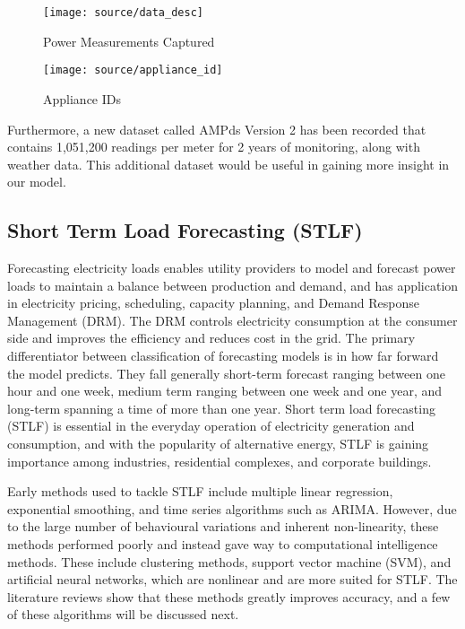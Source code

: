 \documentclass[12pt,twocolumn]{article}
\begin{document}
				\begin{figure}[!htbp]
					\centering
					\texttt{[image: source/data\_desc]}
					\caption{Power Measurements Captured}
					\label{fig:varnorm}
				\end{figure}

				\begin{figure}[!h]
					\centering
					\texttt{[image: source/appliance\_id]}
					\caption{Appliance IDs}
					\label{fig:varnorm}
				\end{figure}

				\quad Furthermore, a new dataset called AMPds Version 2 has been recorded that contains 1,051,200 readings per meter for 2 years of monitoring, along with weather data. This additional dataset would be useful in gaining more insight in our model. 

		\subsection{Short Term Load Forecasting (STLF)}

			\quad Forecasting electricity loads enables utility providers to model and forecast power loads to maintain a balance between production and demand, and has application in electricity pricing, scheduling, capacity planning, and Demand Response Management (DRM). The DRM controls electricity consumption at the consumer side and improves the efficiency and reduces cost in the grid. The primary differentiator between classification of forecasting models is in how far forward the model predicts. They fall generally short-term forecast ranging between one hour and one week, medium term ranging between one week and one year, and long-term spanning a time of more than one year. Short term load forecasting (STLF) is essential in the everyday operation of electricity generation and consumption, and with the popularity of alternative energy, STLF is gaining importance among industries, residential complexes, and corporate buildings. \newline

			\quad Early methods used to tackle STLF include multiple linear regression, exponential smoothing, and time series algorithms such as ARIMA. However, due to the large number of behavioural variations and inherent non-linearity, these methods performed poorly and instead gave way to computational intelligence methods. These include clustering methods, support vector machine (SVM), and artificial neural networks, which are nonlinear and are more suited for STLF. The literature reviews show that these methods greatly improves accuracy, and a few of these algorithms will be discussed next.
\end{document}
